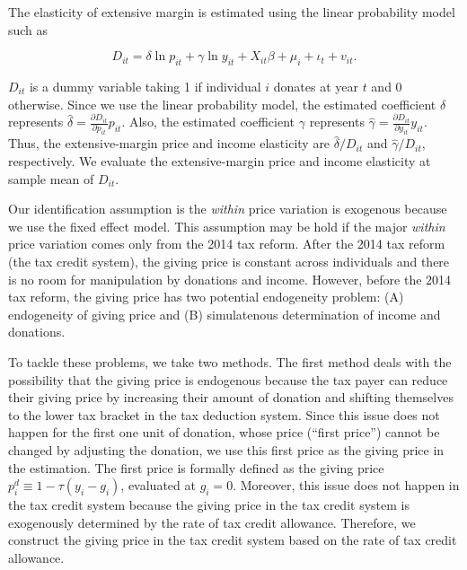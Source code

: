 \documentclass[ review  , 3p ]{elsarticle}
\begin{document}
  The elasticity of extensive margin is estimated using the linear probability model such as

  \begin{equation}
  D_{it} =  \delta \ln p_{it} +\gamma \ln y_{it} + X_{it}\beta+\mu_i  +\iota_t +v_{it}. \label{eq:extensive}
  \end{equation}

  \(D_{it}\) is a dummy variable taking 1 if individual \(i\) donates at year \(t\) and 0 otherwise.
  Since we use the linear probability model,
  the estimated coefficient \(\delta\) represents \(\hat{\delta} = \frac{\partial D_{it}}{\partial p_{it}} p_{it}\).
  Also, the estimated coefficient \(\gamma\) represents \(\hat{\gamma} = \frac{\partial D_{it}}{\partial y_{it}} y_{it}\).
  Thus, the extensive-margin price and income elasticity are \(\hat{\delta}/D_{it}\) and \(\hat{\gamma}/D_{it}\), respectively.
  We evaluate the extensive-margin price and income elasticity at sample mean of \(D_{it}\).

  Our identification assumption is the \emph{within} price variation is exogenous because we use the fixed effect model.
  This assumption may be hold if the major \emph{within} price variation comes only from the 2014 tax reform.
  After the 2014 tax reform (the tax credit system), the giving price is constant across individuals and
  there is no room for manipulation by donations and income.
  However, before the 2014 tax reform, the giving price has two potential endogeneity problem:
  (A) endogeneity of giving price and (B) simulatenous determination of income and donations.

  To tackle these problems, we take two methods.
  The first method deals with the possibility that the giving price is endogenous because
  the tax payer can reduce their giving price by increasing their amount of donation and shifting themselves to the lower tax bracket in the tax deduction system.
  Since this issue does not happen for the first one unit of donation, whose price (``first price'') cannot be changed by adjusting the donation, we use this first price as the giving price in the estimation.
  The first price is formally defined as the giving price \(p_i^d \equiv 1 - \tau (y_i - g_i)\), evaluated at \(g_i = 0\).
  Moreover, this issue does not happen in the tax credit system because the giving price in the tax credit system is exogenously determined by the rate of tax credit allowance.
  Therefore, we construct the giving price in the tax credit system based on the rate of tax credit allowance.
\end{document}
